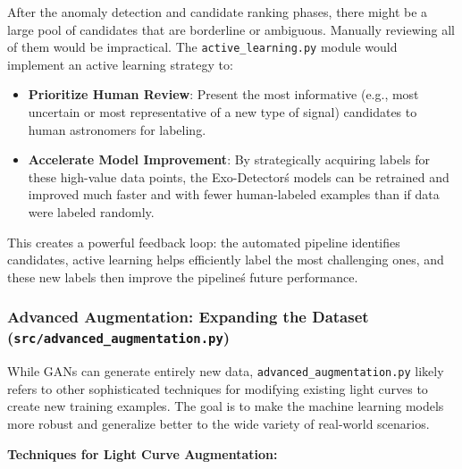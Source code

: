 \documentclass{article}
\begin{document}
After the anomaly detection and candidate ranking phases, there might be a large pool of candidates that are borderline or ambiguous. Manually reviewing all of them would be impractical. The \texttt{active\_learning.py} module would implement an active learning strategy to:

\begin{itemize}
    \item \textbf{Prioritize Human Review}: Present the most informative (e.g., most uncertain or most representative of a new type of signal) candidates to human astronomers for labeling.
    \item \textbf{Accelerate Model Improvement}: By strategically acquiring labels for these high-value data points, the Exo-Detector\'s models can be retrained and improved much faster and with fewer human-labeled examples than if data were labeled randomly.
\end{itemize}

This creates a powerful feedback loop: the automated pipeline identifies candidates, active learning helps efficiently label the most challenging ones, and these new labels then improve the pipeline\'s future performance.

\subsubsection{Advanced Augmentation: Expanding the Dataset (\texttt{src/advanced\_augmentation.py})}

While GANs can generate entirely new data, \texttt{advanced\_augmentation.py} likely refers to other sophisticated techniques for modifying existing light curves to create new training examples. The goal is to make the machine learning models more robust and generalize better to the wide variety of real-world scenarios.

\textbf{Techniques for Light Curve Augmentation:}
\end{document}
